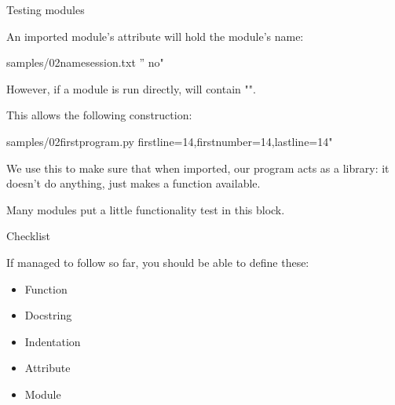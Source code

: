 \documentclass{pyslides}
\begin{document}
\begin{frame}[fragile]{Testing modules}

An imported module's {\tt{}} attribute will hold the module's name:

 samples/02namesession.txt '' no"

However, if a module is run directly, {\tt{}} will contain "".

This allows the following construction:

 samples/02firstprogram.py firstline=14,firstnumber=14,lastline=14"

We use this to make sure that when imported, our program acts as a library:
it doesn't do anything, just makes a function available.

Many modules put a little functionality test in this block.

\end{frame}

\begin{frame}[fragile]{Checklist}

If managed to follow so far, you should be able to define these:

\begin{itemize}
\item Function
\item Docstring
\item Indentation
\item Attribute
\item Module
\end{itemize}

\end{frame}

% 
% 
% 
% 
\end{document}
